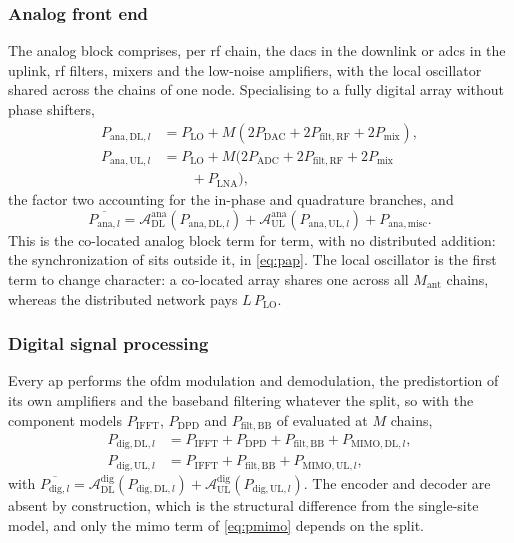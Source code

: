 \subsubsection{Analog front end}
The analog block comprises, per \gls{rf} chain, the \glspl{dac} in the downlink
or \glspl{adc} in the uplink, \gls{rf} filters, mixers and the low-noise
amplifiers, with the local oscillator shared across the chains of one node.
Specialising \cite{peschiera2026fr3} to a fully digital array without phase
shifters,
\begin{align}
\label{eq:ana_dl_ap}
P_{\mathrm{ana,DL},l} &= P_{\mathrm{LO}} + M\left(
2P_{\mathrm{DAC}} + 2P_{\mathrm{filt,RF}} + 2P_{\mathrm{mix}}\right),\\
\label{eq:ana_ul_ap}
P_{\mathrm{ana,UL},l} &= P_{\mathrm{LO}} + M\big(
2P_{\mathrm{ADC}} + 2P_{\mathrm{filt,RF}} + 2P_{\mathrm{mix}} \nonumber\\
&\qquad + P_{\mathrm{LNA}}\big),
\end{align}
the factor two accounting for the in-phase and quadrature branches, and
\begin{equation}
\label{eq:ana_avg_ap}
\overline{P_{\mathrm{ana},l}} =
\mathcal{A}_{\mathrm{DL}}^{\mathrm{ana}}\!\left(P_{\mathrm{ana,DL},l}\right)
+ \mathcal{A}_{\mathrm{UL}}^{\mathrm{ana}}\!\left(P_{\mathrm{ana,UL},l}\right)
+ P_{\mathrm{ana,misc}} .
\end{equation}
This is the co-located analog block term for term, with no distributed addition:
the synchronization of  sits outside it, in \eqref{eq:pap}.
The local oscillator is the first term to change character: a co-located array
shares one across all $M_{\mathrm{ant}}$ chains, whereas the distributed network pays
$L\,P_{\mathrm{LO}}$.

\subsubsection{Digital signal processing}
Every \gls{ap} performs the \gls{ofdm} modulation and demodulation, the
predistortion of its own amplifiers and the baseband filtering whatever the
split, so with the component models $P_{\mathrm{IFFT}}$, $P_{\mathrm{DPD}}$ and
$P_{\mathrm{filt,BB}}$ of \cite{peschiera2026fr3} evaluated at $M$ chains,
\begin{align}
\label{eq:dig_ap}
P_{\mathrm{dig,DL},l} &= P_{\mathrm{IFFT}} + P_{\mathrm{DPD}}
+ P_{\mathrm{filt,BB}} + P_{\mathrm{MIMO,DL},l},\\
P_{\mathrm{dig,UL},l} &= P_{\mathrm{IFFT}} + P_{\mathrm{filt,BB}}
+ P_{\mathrm{MIMO,UL},l},
\end{align}
with $\overline{P_{\mathrm{dig},l}} =
\mathcal{A}_{\mathrm{DL}}^{\mathrm{dig}}(P_{\mathrm{dig,DL},l})
+ \mathcal{A}_{\mathrm{UL}}^{\mathrm{dig}}(P_{\mathrm{dig,UL},l})$. The encoder
and decoder are absent by construction, which is the structural difference from
the single-site model, and only the \gls{mimo} term of \eqref{eq:pmimo} depends
on the split.

